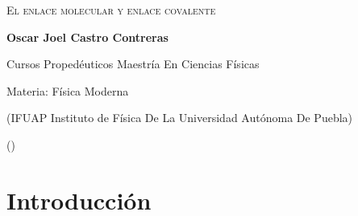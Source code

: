 \documentclass[12pt]{article}
\begin{document}
	
	\begin{titlepage}
	
		\centering
		{\bfseries
               {\scshape\LARGE El enlace molecular y enlace covalente \par}
		\par}
		\vspace{1cm}
		{\LARGE \textbf{Oscar Joel Castro Contreras} \par}
          \vspace{0.5cm}
          {\large Cursos Propedéuticos Maestría En Ciencias Físicas\par}
          {\large Materia: Física Moderna\par}
		\vspace{1cm}
           
          {\large (IFUAP Instituto de Física De La Universidad Autónoma De Puebla) \par}
		{\large (\Today) \par}
		\thispagestyle{empty}
          \vspace{1cm}

	\end{titlepage}

     \newpage

     \thispagestyle{empty}

     \begingroup
     
     \renewcommand{\addtocontents}[2]{}
	
     \tableofcontents		

     \endgroup

     \newpage	

     \setcounter{page}{1} 	
	
     \section{Introducción}\label{sec:Introducción}
\end{document}
